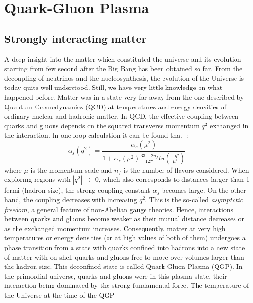 
\chapter{Quark-Gluon Plasma} %

\label{Chapter1} %

\section{Strongly interacting matter}
A deep insight into the matter which constituted the universe and its evolution
starting from few second after the Big Bang has been obtained so far.
From the decoupling of neutrinos 
and the nucleosynthesis, the evolution of the Universe is today quite well
understood. Still, we have very little knowledge on what happened before.
Matter was in a state very far away from the one described by Quantum 
Cromodynamics (QCD) at temperatures and energy densities 
of ordinary nuclear and hadronic matter. 
In QCD, the effective coupling between quarks 
and gluons depends on the squared transverse momentum $q^2$ exchanged
 in the interaction. In one loop calculation it can be found that~\cite{Wilson:1970ag}:
\begin{equation}
\alpha_s(q^2)=\frac{\alpha_s (\mu^2)}{1+\alpha_s (\mu^2) \frac{33-2n_f}{12\pi}ln(\frac{-q^2}{\mu^2})}
\end{equation}
where $\mu$ is the momentum scale and $n_f$ is the number of flavors 
considered. When exploring regions with $|q^2|\rightarrow$ 0, which also 
corresponds to distances larger than 1 fermi (hadron size), the strong 
coupling constant $\alpha_s$ becomes large. On the other hand, the coupling 
decreases with increasing $q^2$. This is the so-called {\it asymptotic freedom}, 
a general feature of non-Abelian gauge theories. Hence, interactions between 
quarks and gluons become weaker as their mutual distance decreases or as the 
exchanged momentum increases.
Consequently, matter at very high temperatures or energy densities (or at high values 
of both of them) undergoes a phase transition from a state with quarks confined into 
hadrons into a new state of matter with on-shell quarks and gluons free to move over
volumes larger than the hadron size. This deconfined state is called Quark-Gluon Plasma (QGP).
In the primordial universe, quarks and gluons were in this plasma state, their interaction 
being dominated by the strong fundamental force.
The temperature of the Universe at the time of the QGP 
